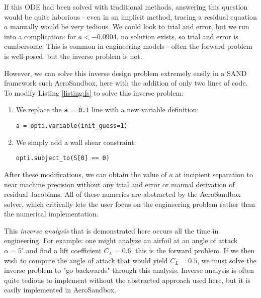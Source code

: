 If this ODE had been solved with traditional methods, answering this question would be quite laborious - even in an implicit method, tracing a residual equation $a$ manually would be very tedious. We could look to trial and error, but we run into a complication: for $a<-0.0904$, no solution exists, so trial and error is cumbersome. This is common in engineering models - often the forward problem is well-posed, but the inverse problem is not.

However, we can solve this inverse design problem extremely easily in a SAND framework such AeroSandbox, here with the addition of only two lines of code. To modify Listing \ref{listing:fs} to solve this inverse problem:

\begin{enumerate}[noitemsep]

    \item We replace the \texttt{a = 0.1} line with a new variable definition:
    \begin{verbatim}
a = opti.variable(init_guess=1)
    \end{verbatim}

    \item We simply add a wall shear constraint:
    \begin{verbatim}
opti.subject_to(S[0] == 0)
    \end{verbatim}

\end{enumerate}

After these modifications, we can obtain the value of $a$ at incipient separation to near machine precision without any trial and error or manual derivation of residual Jacobians. All of these numerics are abstracted by the AeroSandbox solver, which critically lets the user focus on the engineering problem rather than the numerical implementation.

This \textit{inverse analysis} that is demonstrated here occurs all the time in engineering. For example: one might analyze an airfoil at an angle of attack $\alpha = 5^\circ$ and find a lift coefficient $C_L = 0.6$; this is the forward problem. If we then wish to compute the angle of attack that would yield $C_L=0.5$, we must solve the inverse problem to "go backwards" through this analysis. Inverse analysis is often quite tedious to implement without the abstracted approach used here, but it is easily implemented in AeroSandbox.
